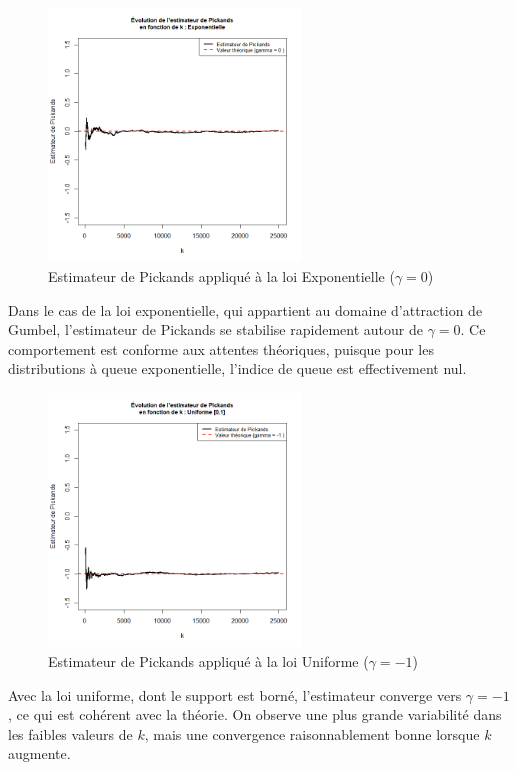 \documentclass{article}
\theoremstyle{plain}
\theoremstyle{definition}
\theoremstyle{plain}
\begin{document}
\begin{figure}[H]
    \centering
    \includegraphics[width=0.6\textwidth]{./Evolution des estimateurs/pickands/estimateur_pickands_exponentielle.png}
    \caption{Estimateur de Pickands appliqué à la loi Exponentielle ($\gamma = 0$)}
\end{figure}
Dans le cas de la loi exponentielle, qui appartient au domaine d'attraction de Gumbel, l’estimateur de Pickands se stabilise rapidement autour de \(\gamma = 0\). Ce comportement est conforme aux attentes théoriques, puisque pour les distributions à queue exponentielle, l’indice de queue est effectivement nul.
\begin{figure}[H]
    \centering
    \includegraphics[width=0.6\textwidth]{./Evolution des estimateurs/pickands/estimateur_pickands_uniforme.png}
    \caption{Estimateur de Pickands appliqué à la loi Uniforme ($\gamma = -1$)}
\end{figure}
Avec la loi uniforme, dont le support est borné, l’estimateur converge vers $\gamma = -1$, ce qui est cohérent avec la théorie. On observe une plus grande variabilité dans les faibles valeurs de $k$, mais une convergence raisonnablement bonne lorsque $k$ augmente.
\end{document}
